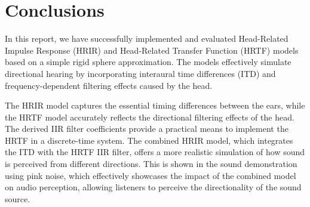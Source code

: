 \chapter{Conclusions}
\label{ch:conclusions}

In this report, we have successfully implemented and evaluated Head-Related Impulse Response (HRIR) and Head-Related Transfer Function (HRTF) models based on a simple rigid sphere approximation. The models effectively simulate directional hearing by incorporating interaural time differences (ITD) and frequency-dependent filtering effects caused by the head. 

The HRIR model captures the essential timing differences between the ears, while the HRTF model accurately reflects the directional filtering effects of the head. The derived IIR filter coefficients provide a practical means to implement the HRTF in a discrete-time system. The combined HRIR model, which integrates the ITD with the HRTF IIR filter, offers a more realistic simulation of how sound is perceived from different directions. This is shown in the sound demonstration using pink noise, which effectively showcases the impact of the combined model on audio perception, allowing listeners to perceive the directionality of the sound source.